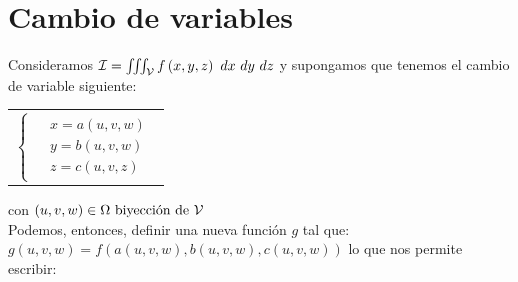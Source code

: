 \documentclass{report}
\begin{document}
  \section{Cambio de variables}
    \noindent Consideramos $\mathcal{I}=\iiint_{\mathcal{V}} f\left(x,y,z\right)\ dx\ dy\ dz$ y supongamos que tenemos
    el cambio de variable siguiente:\\
    \begin{tabular}{l}
      \hspace{-1cm}
      $\begin{cases}\begin{aligned}
        &x=a\left(u,v,w\right)\\
        &y=b\left(u,v,w\right)\\
        &z=c\left(u,v,z\right)
      \end{aligned}\end{cases}$\\
    \end{tabular}
    con $\left(u,v,w\right)\in\Omega\text{ biyección de }\mathcal{V}$\\
    Podemos, entonces, definir una nueva función $g$ tal que: $g\left(u,v,w\right)=
    f\left(a\left(u,v,w\right),b\left(u,v,w\right),c\left(u,v,w\right)\right)$ lo que nos
    permite escribir:
\end{document}
